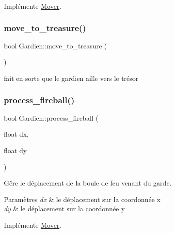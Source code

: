 Implémente \hyperlink{classMover_a2e1858e5c93ddaa85ff7b446ad403b79}{Mover}.

\mbox{\label{classGardien_a1661d21c1b1f3155fd626c1af22db4fc}} 
\subsubsection{\texorpdfstring{move\+\_\+to\+\_\+treasure()}{move\_to\_treasure()}}
{\footnotesize\ttfamily bool Gardien\+::move\+\_\+to\+\_\+treasure (\begin{DoxyParamCaption}{ }\end{DoxyParamCaption})\hspace{0.3cm}{\ttfamily [private]}}



fait en sorte que le gardien aille vers le trésor 

\mbox{\label{classGardien_ad1d0f6aca8be28477e16dae7a30301b8}} 
\subsubsection{\texorpdfstring{process\+\_\+fireball()}{process\_fireball()}}
{\footnotesize\ttfamily bool Gardien\+::process\+\_\+fireball (\begin{DoxyParamCaption}\item[{float}]{dx,  }\item[{float}]{dy }\end{DoxyParamCaption})\hspace{0.3cm}{\ttfamily [virtual]}}



Gčre le déplacement de la boule de feu venant du garde. 


\begin{DoxyParams}{Paramètres}
{\em dx} & le déplacement sur la coordonnée x \\
\hline
{\em dy} & le déplacement sur la coordonnée y \\
\hline
\end{DoxyParams}


Implémente \hyperlink{classMover_a6d794056f34e2348d32ae4ff49326070}{Mover}.

